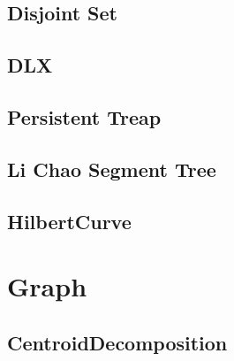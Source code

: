 \documentclass[a4paper,10pt,twocolumn,oneside]{article}
\begin{document}
\subsection{Disjoint Set}


\subsection{DLX}


\subsection{Persistent Treap}


\subsection{Li Chao Segment Tree}


\subsection{HilbertCurve}


% 

\section{Graph}

% 

% 

\subsection{CentroidDecomposition}

\end{document}
